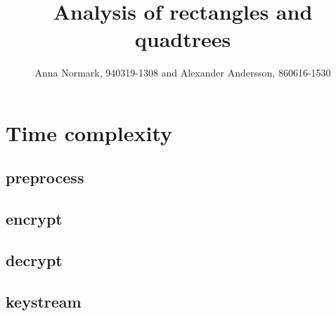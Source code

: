 \documentclass[12pt, a4paper]{article}
\title{Analysis of rectangles and quadtrees}
\author{Anna Normark, 940319-1308 and Alexander Andersson, 860616-1530}
\begin{document}
\maketitle

\section{Time complexity}




\subsection{preprocess}




\subsection{encrypt}




\subsection{decrypt}




\subsection{keystream}
\end{document}
